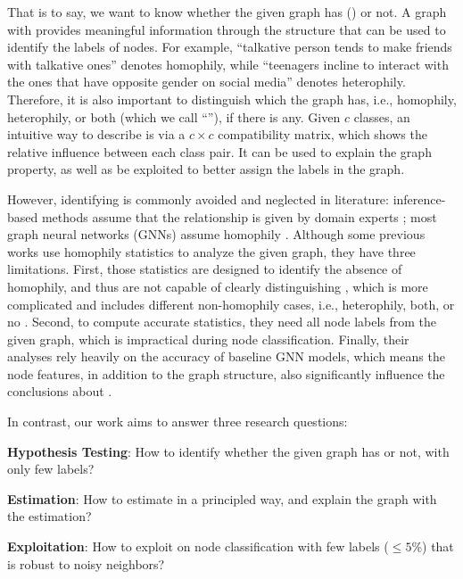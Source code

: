 That is to say, we want to know whether the given graph has \neteffect (\nef) or not.
A graph with \nef provides meaningful information through the structure that can be used to identify the labels of nodes.
For example, ``talkative person tends to make friends with talkative ones'' denotes homophily, 
while ``teenagers incline to interact with the ones that have opposite gender on social media'' denotes heterophily.
Therefore, it is also important to distinguish which \nef the graph has, i.e., homophily, heterophily, or both (which we call ``\xophily''), if there is any.
Given $c$ classes, an intuitive way to describe \nef is via a $c \times c$ compatibility matrix, which shows the relative influence between each class pair.
It can be used to explain the graph property, as well as be exploited to better assign the labels in the graph.

However, identifying \nef is commonly avoided and neglected in literature:
inference-based methods assume that the relationship is given by domain experts \cite{DBLP:journals/pvldb/GatterbauerGKF15, eswaran2020higher};
most graph neural networks (GNNs) assume homophily \cite{kipf2016semi, klicpera2018predict, wu2019simplifying}.
Although some previous works \cite{zhu2020beyond, luan2021heterophily, lim2021large, ma2022is} use homophily statistics to analyze the given graph, they have three limitations.
First, those statistics are designed to identify the absence of homophily, and thus are not capable of clearly distinguishing \nef, which is more complicated and includes different non-homophily cases, i.e., heterophily, both, or no \nef.
Second, to compute accurate statistics, they need all node labels from the given graph, which is impractical during node classification.
Finally, their analyses rely heavily on the accuracy of baseline GNN models, which means the node features, in addition to the graph structure, also significantly influence the conclusions about \nef.

In contrast, our work aims to answer three research questions:
\begin{compactenum}[{RQ}1.]
    \item {\bf Hypothesis Testing}: How to identify whether the given graph has \nef or not, with only few labels? 
    \item {\bf Estimation}: How to estimate \nef in a principled way, and explain the graph with the estimation?
    \item {\bf Exploitation}: How to exploit \nef on node classification with few labels ($\leq 5$\%) that is robust to noisy neighbors?
\end{compactenum}

